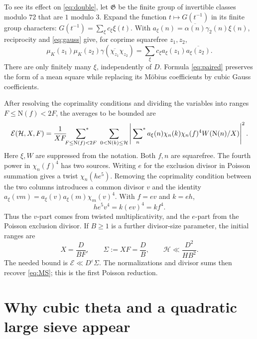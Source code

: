\documentclass[11pt]{article}
\newcommand{\N}{\mathrm N}
\newcommand{\muk}{\mu_K}
\newcommand{\E}{\mathcal E}
\newcommand{\starred}{\sideset{}{^*}\sum}
\numberwithin{equation}{section}
\begin{document}
To see its effect on \eqref{eq:double}, let $\mathfrak G$ be the finite
group of invertible classes modulo $72$ that are $1$ modulo $3$.
Expand the function $t\mapsto G(t^{-1})$ in its finite group characters:
$G(t^{-1})=\sum_\xi c_\xi\xi(t)$. With
$a_\xi(n)=\overline{\alpha(n)}\gamma_2(n)\xi(n)$, reciprocity and
\eqref{eq:gauss} give, for coprime squarefree $z_1,z_2$,
\begin{equation}\label{eq:paired}
 \muk(z_1)\muk(z_2)\gamma(\overline{\chi_{z_1}}\chi_{z_2})
 =\sum_\xi c_\xi a_\xi(z_1)\overline{a_\xi(z_2)}.
\end{equation}
There are only finitely many $\xi$, independently of $D$. Formula
\eqref{eq:paired} preserves the form of a mean square while replacing
its M\"obius coefficients by cubic Gauss coefficients.

After resolving the coprimality conditions and dividing the variables
into ranges $F\le\N(f)<2F$, the averages to be bounded are
\begin{equation}\label{eq:energy}
 \E(\mathcal H,X,F)=\frac1{XF}
 \starred_{F\le\N(f)<2F}\ \sum_{0<\N(k)\le\mathcal H}
 \left|\starred_n a_\xi(n)\chi_n(k)\chi_n(f)^4W(\N(n)/X)\right|^2.
\end{equation}
Here $\xi,W$ are suppressed from the notation. Both $f,n$ are squarefree.
The fourth power in $\chi_n(f)^4$ has two sources. Writing $e$ for the
exclusion divisor in Poisson summation gives a twist $\chi_n(he^5)$.
Removing the coprimality condition between the two columns introduces
a common divisor $v$ and the identity
$a_\xi(vm)=a_\xi(v)a_\xi(m)\chi_m(v)^4$. With $f=ev$ and $k=eh$,
\begin{equation}\label{eq:fourthpower}
 he^5v^4=k(ev)^4=kf^4.
\end{equation}
Thus the $v$-part comes from twisted multiplicativity, and the $e$-part
from the Poisson exclusion divisor. If $B\ge1$ is a further divisor-size
parameter, the initial ranges are
\begin{equation}\label{eq:initial}
 X=\frac D{BF},\qquad \Sigma:=XF=\frac DB,\qquad
 \mathcal H\ll\frac{D^2}{HB^2}.
\end{equation}
The needed bound is $\E\ll D^\varepsilon\Sigma$. The normalizations and
divisor sums then recover \eqref{eq:MS}; this is the first Poisson
reduction.

\section{Why cubic theta and a quadratic large sieve appear}\label{sec:theta}
\end{document}
